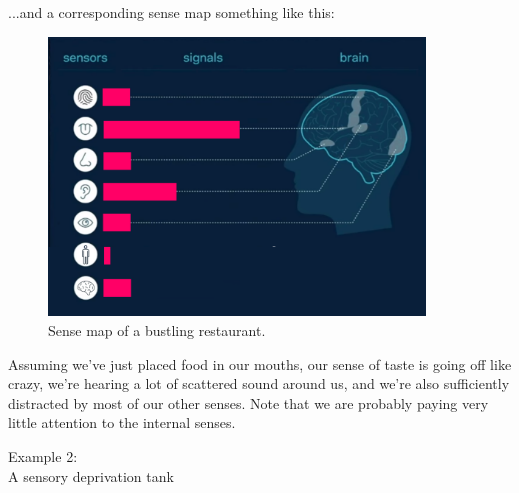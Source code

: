 \documentclass{article}
\begin{document}
...and a corresponding sense map something like this:

\begin{figure}[h]
  \centering
  \includegraphics[width=10cm]{images/ma-noisy-restaurant.png}
  \caption{Sense map of a bustling restaurant.}
  \label{fig:sense-map-bustling-restaurant}
\end{figure}

Assuming we've just placed food in our mouths, our sense of taste is going off like crazy, we're hearing a lot of scattered sound around us, and we're also sufficiently distracted by most of our other senses. Note that we are probably paying very little attention to the internal senses.

\pagebreak

\begin{center}
  \LARGE{Example 2:}\\
  \LARGE{A sensory deprivation tank}
\end{center}
\end{document}
